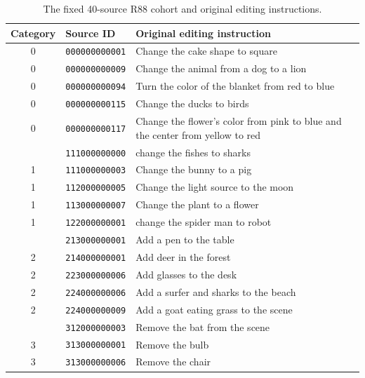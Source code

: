 \begin{table}[!t]
\centering
\begin{minipage}{6.9in}
\fontsize{8}{9.2}\selectfont
\caption{The fixed 40-source R88 cohort and original editing instructions.}
\label{tab:r88-source-manifest40}
\setlength{\tabcolsep}{3pt}
\renewcommand{\arraystretch}{1.08}
\begin{tabularx}{\linewidth}{@{}c l >{\raggedright\arraybackslash}X@{}}
\toprule
Category & Source ID & Original editing instruction \\
\midrule
0 & \texttt{000000000001} & Change the cake shape to square \\
0 & \texttt{000000000009} & Change the animal from a dog to a lion \\
0 & \texttt{000000000094} & Turn the color of the blanket from red to blue \\
0 & \texttt{000000000115} & Change the ducks to birds \\
0 & \texttt{000000000117} & Change the flower's color from pink to blue and the center from yellow to red \\
\addlinespace[1pt]
1 & \texttt{111000000000} & change the fishes to sharks \\
1 & \texttt{111000000003} & Change the bunny to a pig \\
1 & \texttt{112000000005} & Change the light source to the moon \\
1 & \texttt{113000000007} & Change the plant to a flower \\
1 & \texttt{122000000001} & change the spider man to robot \\
\addlinespace[1pt]
2 & \texttt{213000000001} & Add a pen to the table \\
2 & \texttt{214000000001} & Add deer in the forest \\
2 & \texttt{223000000006} & Add glasses to the desk \\
2 & \texttt{224000000006} & Add a surfer and sharks to the beach \\
2 & \texttt{224000000009} & Add a goat eating grass to the scene \\
\addlinespace[1pt]
3 & \texttt{312000000003} & Remove the bat from the scene \\
3 & \texttt{313000000001} & Remove the bulb \\
3 & \texttt{313000000006} & Remove the chair \\

\end{tabularx}
\end{minipage}
\end{table}
